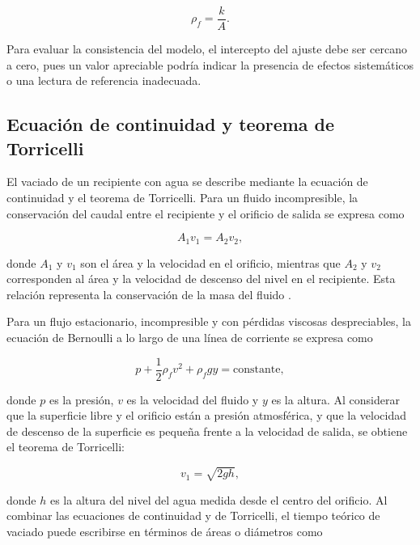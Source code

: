 \begin{equation}
    \rho_f = \frac{k}{A}.
    \label{eq:densidad}
\end{equation}

Para evaluar la consistencia del modelo, el intercepto del ajuste debe ser cercano a cero, pues un valor apreciable podría indicar la presencia de efectos sistemáticos o una lectura de referencia inadecuada.

\subsection{Ecuación de continuidad y teorema de Torricelli}

El vaciado de un recipiente con agua se describe mediante la ecuación de continuidad y el teorema de Torricelli. Para un fluido incompresible, la conservación del caudal entre el recipiente y el orificio de salida se expresa como

\begin{equation}
    A_1v_1=A_2v_2,
    \label{eq:continuidad}
\end{equation}

donde $A_1$ y $v_1$ son el área y la velocidad en el orificio, mientras que $A_2$ y $v_2$ corresponden al área y la velocidad de descenso del nivel en el recipiente. Esta relación representa la conservación de la masa del fluido \cite{young2018}.

Para un flujo estacionario, incompresible y con pérdidas viscosas despreciables, la ecuación de Bernoulli a lo largo de una línea de corriente se expresa como

\begin{equation}
    p+\frac{1}{2}\rho_fv^2+\rho_fgy=\text{constante},
    \label{eq:bernoulli}
\end{equation}

donde $p$ es la presión, $v$ es la velocidad del fluido y $y$ es la altura. Al considerar que la superficie libre y el orificio están a presión atmosférica, y que la velocidad de descenso de la superficie es pequeña frente a la velocidad de salida, se obtiene el teorema de Torricelli:

\begin{equation}
    v_1=\sqrt{2gh},
    \label{eq:torricelli}
\end{equation}

donde $h$ es la altura del nivel del agua medida desde el centro del orificio. Al combinar las ecuaciones de continuidad y de Torricelli, el tiempo teórico de vaciado puede escribirse en términos de áreas o diámetros como

